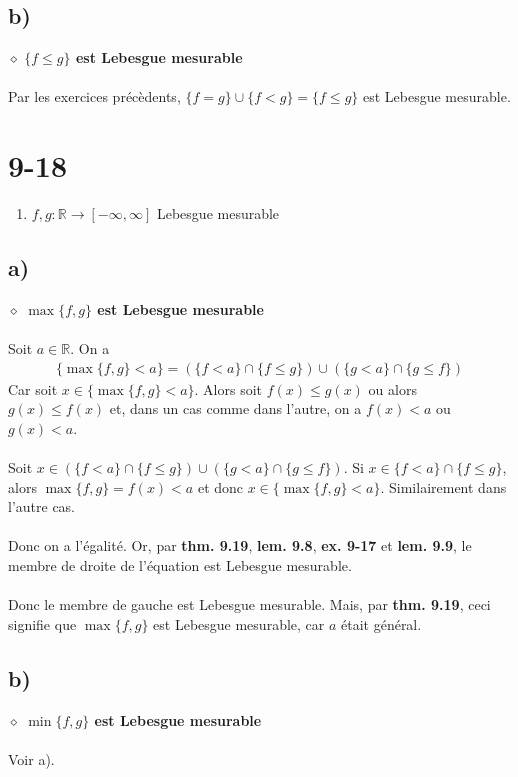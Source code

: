 \documentclass[a4paper,10pt]{article}
\begin{document}
\subsection*{b)}
$\diamond$ \textbf{$\{f \leq g \}$ est Lebesgue mesurable}
\\
\\
Par les exercices précèdents, $\{f = g\} \cup \{f < g\} = \{f \leq g\}$ est Lebesgue mesurable.

\section*{9-18}
\begin{enumerate}
	\item $f,g : \mathbb{R} \rightarrow [-\infty, \infty]$ Lebesgue mesurable
\end{enumerate}

\subsection*{a)}
$\diamond$ \textbf{$\max \{f,g\}$ est Lebesgue mesurable}
\\
\\
Soit $a \in \mathbb{R}$. On a 
\begin{align*}
	\{ \max \{f,g\} < a \} = (\{f < a\} \cap \{f \leq g \}) \cup (\{g < a\} \cap \{g \leq f \})
\end{align*}
Car soit $x \in \{ \max \{f,g\} < a \}$. Alors soit $f(x) \leq g(x)$ ou alors $g(x) \leq f(x)$ et, dans un cas comme dans l'autre, on a $f(x) < a$ ou $g(x) < a$. 
\\
\\
Soit $x \in (\{f < a\} \cap \{f \leq g\}) \cup (\{g < a \} \cap \{g \leq f\})$. Si $x \in \{f < a\} \cap \{ f \leq g\}$, alors $\max \{f,g\} = f(x) < a$ et donc $x \in \{\max \{f,g\} < a \}$. Similairement dans l'autre cas. 
\\
\\
Donc on a l'égalité. Or, par \textbf{thm. 9.19}, \textbf{lem. 9.8}, \textbf{ex. 9-17} et \textbf{lem. 9.9}, le membre de droite de l'équation est Lebesgue mesurable.
\\
\\
Donc le membre de gauche est Lebesgue mesurable. Mais, par \textbf{thm. 9.19}, ceci signifie que $\max \{f,g\}$ est Lebesgue mesurable, car $a$ était général. 

\subsection*{b)}
$\diamond$ \textbf{$\min \{f,g\}$ est Lebesgue mesurable}
\\
\\
Voir a).  
\end{document}
